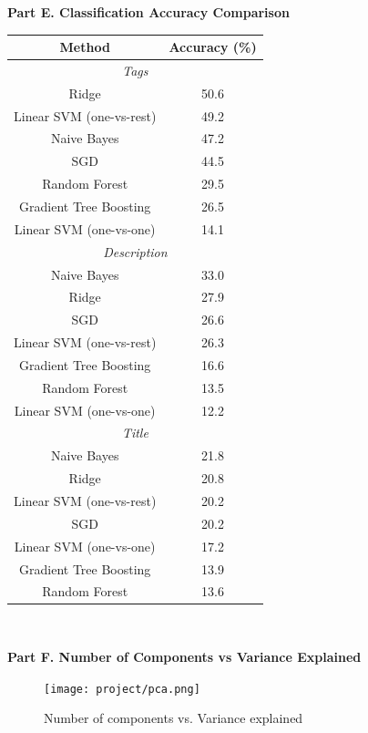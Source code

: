 \documentclass[english]{article}
\begin{document}
\bf{Part E. Classification Accuracy Comparison}
\begin{table}[H]
    \centering
    \begin{tabular}{ *2c } 
     \toprule
     \textbf{Method} & \textbf{Accuracy (\%)}\\
     \midrule
     \multicolumn{2}{c}{\textit{Tags}} \\
     \midrule
     Ridge & 50.6 \\
     Linear SVM (one-vs-rest) & 49.2 \\
     Naive Bayes & 47.2 \\
     SGD & 44.5 \\
     Random Forest & 29.5 \\
     Gradient Tree Boosting & 26.5 \\
     Linear SVM (one-vs-one) & 14.1 \\
     \midrule
     \multicolumn{2}{c}{\textit{Description}} \\
     \midrule
     Naive Bayes & 33.0 \\
     Ridge & 27.9 \\
     SGD & 26.6 \\
     Linear SVM (one-vs-rest) & 26.3 \\
     Gradient Tree Boosting & 16.6 \\
     Random Forest & 13.5 \\
     Linear SVM (one-vs-one) & 12.2 \\
     \midrule
     \multicolumn{2}{c}{\textit{Title}} \\
     \midrule
     Naive Bayes & 21.8 \\
     Ridge & 20.8 \\
     Linear SVM (one-vs-rest) & 20.2 \\
     SGD & 20.2 \\
     Linear SVM (one-vs-one) & 17.2 \\
     Gradient Tree Boosting & 13.9 \\
     Random Forest & 13.6 \\
     \bottomrule
    \end{tabular}
    \label{nnOA}
    \end{table}
    \\
    \pagebreak
    
\bf{Part F. Number of Components vs Variance Explained}
\begin{figure}[H]
    \centering
    \texttt{[image: project/pca.png]}
    \caption{Number of components vs. Variance explained}
    \label{fig:pca}
\end{figure}
\end{document}
